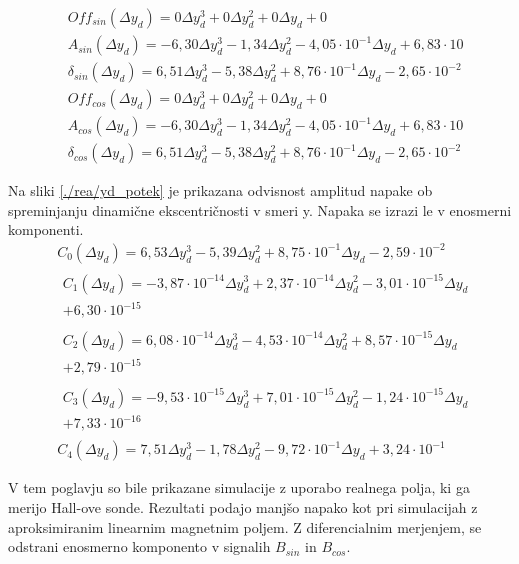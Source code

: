 \begin{eqnarray}
&Off_{sin}(\Delta y_d) =0\Delta y_d^{3}+0\Delta y_d^{2}+0\Delta y_d+0 \\
&A_{sin}(\Delta y_d) =-6,30\Delta y_d^{3}-1,34\Delta y_d^{2}-4,05\cdot 10^{-1}\Delta y_d+6,83\cdot 10 \\                                 
&\delta_{sin}(\Delta y_d) =6,51\Delta y_d^{3}-5,38\Delta y_d^{2}+8,76\cdot 10^{-1}\Delta y_d-2,65\cdot 10^{-2} \\  
&Off_{cos}(\Delta y_d) =0\Delta y_d^{3}+0\Delta y_d^{2}+0\Delta y_d+0 \\
&A_{cos}(\Delta y_d) =-6,30\Delta y_d^{3}-1,34\Delta y_d^{2}-4,05\cdot 10^{-1}\Delta y_d+6,83\cdot 10 \\                                 
&\delta_{cos}(\Delta y_d) =6,51\Delta y_d^{3}-5,38\Delta y_d^{2}+8,76\cdot 10^{-1}\Delta y_d-2,65\cdot 10^{-2} 
\end{eqnarray}

Na sliki \ref{./rea/yd_potek} je prikazana odvisnost amplitud napake ob spreminjanju dinamične ekscentričnosti v smeri y. Napaka se izrazi le v enosmerni komponenti.
\begin{eqnarray}
&C_0(\Delta y_d) =6,53\Delta y_d^{3}-5,39\Delta y_d^{2}+8,75\cdot 10^{-1}\Delta y_d-2,59\cdot 10^{-2} \\                               
&\begin{split}C_1(\Delta y_d) =-3,87\cdot 10^{-14}\Delta y_d^{3}+2,37\cdot 10^{-14}\Delta y_d^{2}-3,01\cdot 10^{-15}\Delta y_d\\+6,30\cdot 10^{-15}\end{split} \\
&\begin{split}C_2(\Delta y_d) =6,08\cdot 10^{-14}\Delta y_d^{3}-4,53\cdot 10^{-14}\Delta y_d^{2}+8,57\cdot 10^{-15}\Delta y_d\\+2,79\cdot 10^{-15}\end{split} \\ 
&\begin{split}C_3(\Delta y_d) =-9,53\cdot 10^{-15}\Delta y_d^{3}+7,01\cdot 10^{-15}\Delta y_d^{2}-1,24\cdot 10^{-15}\Delta y_d\\+7,33\cdot 10^{-16}\end{split} \\
&C_4(\Delta y_d) =7,51\Delta y_d^{3}-1,78\Delta y_d^{2}-9,72\cdot 10^{-1}\Delta y_d+3,24\cdot 10^{-1}        
\end{eqnarray}

V tem poglavju so bile prikazane simulacije z uporabo realnega polja, ki ga merijo Hall-ove sonde. Rezultati podajo manjšo napako kot pri simulacijah z aproksimiranim linearnim magnetnim poljem. Z diferencialnim merjenjem, se odstrani enosmerno komponento v signalih $B_{sin}$ in $B_{cos}$.